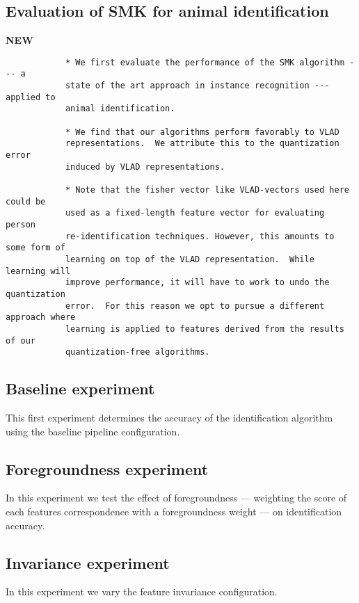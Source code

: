     \subsection{Evaluation of SMK for animal identification}
        {\large{\textbf{NEW}}}

        \begin{verbatim}
            * We first evaluate the performance of the SMK algorithm --- a
            state of the art approach in instance recognition --- applied to
            animal identification.

            * We find that our algorithms perform favorably to VLAD
            representations.  We attribute this to the quantization error
            induced by VLAD representations.

            * Note that the fisher vector like VLAD-vectors used here could be
            used as a fixed-length feature vector for evaluating person
            re-identification techniques. However, this amounts to some form of
            learning on top of the VLAD representation.  While learning will
            improve performance, it will have to work to undo the quantization
            error.  For this reason we opt to pursue a different approach where
            learning is applied to features derived from the results of our
            quantization-free algorithms.
        \end{verbatim}
        
    \subsection{Baseline experiment}
        This first experiment determines the accuracy of the identification algorithm using the baseline pipeline
          configuration.
        
    \subsection{Foregroundness experiment}
        
        In this experiment we test the effect of foregroundness --- weighting the score of each features
          correspondence with a foregroundness weight --- on identification accuracy.
        
    \subsection{Invariance experiment}
        In this experiment we vary the feature invariance configuration.
        

